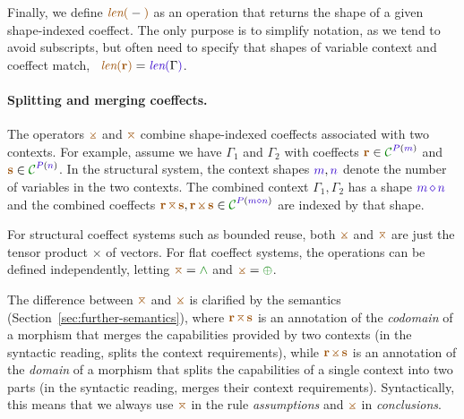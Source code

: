 Finally, we define $\alen{-}$ as an operation that returns the shape of a given shape-indexed
coeffect. The only purpose is to simplify notation, as we tend to avoid subscripts, but often need
to specify that shapes of variable context and coeffect match,
\eg~$\alen{\aclrd{\textbf{r}}} = \slen{\Gamma}$.

\paragraph{Splitting and merging coeffects.}
The operators $\apar$ and $\azip$ combine shape-indexed coeffects associated with two contexts.
For example, assume we have $\Gamma_1$ and $\Gamma_2$ with coeffects $\aclrd{\textbf{r}} \in
\C^{\SP(\sclrd{m})}$ and $\aclrd{\textbf{s}} \in \C^{\SP(\sclrd{n})}$. In the structural system, the
context shapes $\sclrd{m}, \sclrd{n}$ denote the number of variables in the two contexts. The
combined context $\Gamma_1, \Gamma_2$ has a shape $\sclrd{m}\,\stimes\,\sclrd{n}$ and the combined
coeffects $\aclrd{\textbf{r}} \,\azip\, \aclrd{\textbf{s}}, \aclrd{\textbf{r}} \,\apar\, \aclrd{\textbf{s}}
\in \C^{\SP(\sclrd{m} \stimes \sclrd{n})}$ are indexed by that shape.

For structural coeffect systems such as bounded reuse, both $\apar$ and $\azip$ are
just the tensor product $\times$ of vectors. For flat coeffect systems, the operations
can be defined independently, letting $\azip=\czip$ and $\apar=\cpar$.

The difference between $\azip$ and $\apar$ is clarified by the semantics (Sec\-tion~\ref{sec:further-semantics}),
where $\aclrd{\textbf{r}}\,\azip\,\aclrd{\textbf{s}}$ is an annotation of the \emph{codomain} of
a morphism that merges the capabilities provided by two contexts (in the syntactic
reading, splits the context requirements), while $\aclrd{\textbf{r}}\,\apar\,\aclrd{\textbf{s}}$
is an annotation of the \emph{domain} of a morphism that splits the capabilities of a single
context into two parts (in the syntactic reading, merges their context requirements).
Syntactically, this means that we always use $\azip$ in the rule \emph{assumptions} and
$\apar$ in \emph{conclusions}.


\newcommand{\tystmt}[2]{ (\text{\footnotesize{#1}})~~{#2} }
\newcommand{\ctxtrans}[3]{ #2 \rightsquigarrow #1, #3 }
\newcommand{\ctxtransnl}[3]{ \begin{array}{l} #2 \rightsquigarrow\\ #1, #3 \end{array}}


